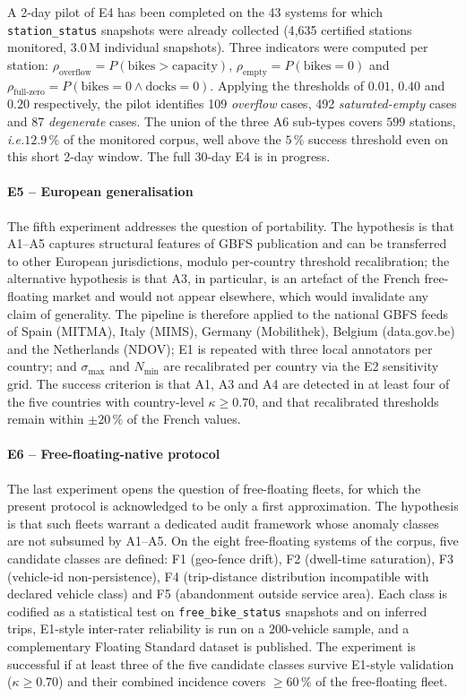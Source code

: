 \documentclass[a4paper,twoside]{article}
\newcommand{\ie}{\emph{i.e.}}
\begin{document}
A 2-day pilot of E4 has been completed on the 43 systems for
which \texttt{station\_status} snapshots were already collected
(4{,}635 certified stations monitored, 3.0\,M individual
snapshots). Three indicators were computed per station:
$\rho_{\text{overflow}} = P(\text{bikes} > \text{capacity})$,
$\rho_{\text{empty}} = P(\text{bikes} = 0)$ and
$\rho_{\text{full-zero}} =
P(\text{bikes} = 0 \land \text{docks} = 0)$. Applying the
thresholds of $0.01$, $0.40$ and $0.20$ respectively, the pilot
identifies 109 \emph{overflow} cases, 492 \emph{saturated-empty}
cases and 87 \emph{degenerate} cases. The union of the three A6
sub-types covers $599$ stations, \ie $12.9\,\%$ of the monitored
corpus, well above the $5\,\%$ success threshold even on this
short 2-day window. The full 30-day E4 is in progress.

\paragraph{E5 -- European generalisation}
The fifth experiment addresses the question of portability. The
hypothesis is that A1--A5 captures structural features of GBFS
publication and can be transferred to other European
jurisdictions, modulo per-country threshold recalibration; the
alternative hypothesis is that A3, in particular, is an artefact
of the French free-floating market and would not appear
elsewhere, which would invalidate any claim of generality. The
pipeline is therefore applied to the national GBFS feeds of
Spain (MITMA), Italy (MIMS), Germany (Mobilithek), Belgium
(data.gov.be) and the Netherlands (NDOV); E1 is repeated with
three local annotators per country; and $\sigma_{\max}$ and
$N_{\min}$ are recalibrated per country via the E2 sensitivity
grid. The success criterion is that A1, A3 and A4 are detected
in at least four of the five countries with country-level
$\kappa \ge 0.70$, and that recalibrated thresholds remain
within $\pm 20\,\%$ of the French values.

\paragraph{E6 -- Free-floating-native protocol}
The last experiment opens the question of free-floating fleets,
for which the present protocol is acknowledged to be only a first
approximation. The hypothesis is that such fleets warrant a
dedicated audit framework whose anomaly classes are not subsumed
by A1--A5. On the eight free-floating systems of the corpus,
five candidate classes are defined: F1 (geo-fence drift), F2
(dwell-time saturation), F3 (vehicle-id non-persistence), F4
(trip-distance distribution incompatible with declared vehicle
class) and F5 (abandonment outside service area). Each class is
codified as a statistical test on \texttt{free\_bike\_status}
snapshots and on inferred trips, E1-style inter-rater reliability
is run on a 200-vehicle sample, and a complementary Floating
Standard dataset is published. The experiment is successful if
at least three of the five candidate classes survive E1-style
validation ($\kappa \ge 0.70$) and their combined incidence
covers $\ge 60\,\%$ of the free-floating fleet.
\end{document}
